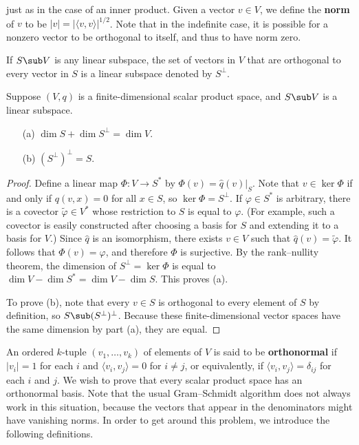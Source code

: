 just as in the case of an inner product. Given a vector $v\in V$, we define 
the \textbf{norm} of $v$ to be $|v|=|\langle v,v\rangle|^{1/2}$. Note that in the indefinite 
case, it is possible for a nonzero vector to be orthogonal to itself, and 
thus to have norm zero.\par
If $S\sub V$ is any linear subspace, the set of vectors in $V$ that are 
orthogonal to every vector in $S$ is a linear subspace denoted by $S^{\bot}$.
\begin{lemma}
Suppose $(V,q)$ is a finite-dimensional scalar product space, and $S\sub V$ 
is a linear subspace.
\begin{itemize}
\item[(a)] $\dim S+\dim S^{\bot}=\dim V$.
\item[(b)] $(S^\bot)^{\bot}=S$. 
\end{itemize}
\end{lemma}
\begin{proof}
Define a linear map $\varPhi:V\to S^*$ by $\varPhi(v)=\widehat{q}(v)|_S$. Note 
that $v\in\ker\varPhi$ if and only if $q(v,x)=0$ for all $x\in S$, so $\ker\varPhi=S^{\bot}$. 
If $\varphi\in S^*$ is arbitrary, there is a covector $\widetilde{\varphi}\in V^*$ 
whose restriction to $S$ is equal to $\varphi$. (For example, such a covector 
is easily constructed after choosing a basis for $S$ and extending it to a basis 
for $V$.) Since $\widehat{q}$ is an isomorphism, there exists $v\in V$ such 
that $\widehat{q}(v)=\widetilde{\varphi}$. It follows that $\varPhi(v)=\varphi$, 
and therefore $\varPhi$ is surjective. By the rank–nullity theorem, the dimension 
of $S^{\bot}=\ker\varPhi$ is equal to $\dim V-\dim S^*=\dim V-\dim S$. This 
proves (a).\par
To prove (b), note that every $v\in S$ is orthogonal to every element of $S$ by 
definition, so $S\sub (S^{\bot})^{\bot}$. Because these finite-dimensional vector 
spaces have the same dimension by part (a), they are equal.
\end{proof}
An ordered $k$-tuple $(v_1,\dots,v_k)$ of elements of $V$ is said to be \textbf{orthonormal} 
if $|v_i|=1$ for each $i$ and $\langle v_i,v_j\rangle=0$ for $i\neq j$, or 
equivalently, if $\langle v_i,v_j\rangle=\delta_{ij}$ for each $i$ and $j$. We wish 
to prove that every scalar product space has an orthonormal basis. Note that 
the usual Gram–Schmidt algorithm does not always work in this situation, because 
the vectors that appear in the denominators might have vanishing norms. In 
order to get around this problem, we introduce the following definitions.\par
